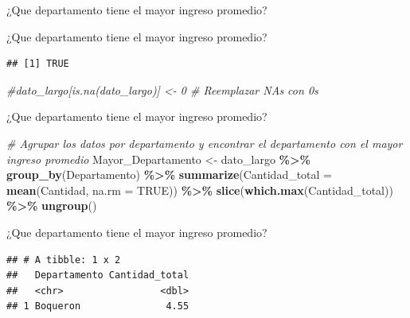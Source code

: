 \documentclass[
  ignorenonframetext,
]{beamer}
\newenvironment{Shaded}{\begin{snugshade}}{\end{snugshade}}
\newcommand{\AttributeTok}[1]{\textcolor[rgb]{0.13,0.29,0.53}{#1}}
\newcommand{\CommentTok}[1]{\textcolor[rgb]{0.56,0.35,0.01}{\textit{#1}}}
\newcommand{\ConstantTok}[1]{\textcolor[rgb]{0.56,0.35,0.01}{#1}}
\newcommand{\FunctionTok}[1]{\textcolor[rgb]{0.13,0.29,0.53}{\textbf{#1}}}
\newcommand{\NormalTok}[1]{#1}
\newcommand{\OtherTok}[1]{\textcolor[rgb]{0.56,0.35,0.01}{#1}}
\newcommand{\SpecialCharTok}[1]{\textcolor[rgb]{0.81,0.36,0.00}{\textbf{#1}}}
\newcommand{\StringTok}[1]{\textcolor[rgb]{0.31,0.60,0.02}{#1}}
\begin{document}
\begin{frame}[fragile]{¿Que departamento tiene el mayor ingreso
promedio?}
\begin{block}{¿Que departamento tiene el mayor ingreso promedio?}
\begin{Shaded}
\end{Shaded}

\begin{verbatim}
## [1] TRUE
\end{verbatim}

\begin{Shaded}
\begin{Highlighting}[]
\CommentTok{\#dato\_largo[is.na(dato\_largo)] \textless{}{-} 0  \# Reemplazar NAs con 0s}
\end{Highlighting}
\end{Shaded}
\end{block}

\begin{block}{¿Que departamento tiene el mayor ingreso promedio?}
\protect\hypertarget{que-departamento-tiene-el-mayor-ingreso-promedio-3}{}
\begin{Shaded}
\begin{Highlighting}[]
\CommentTok{\# Agrupar los datos por departamento y encontrar el departamento con el mayor ingreso promedio}
\NormalTok{Mayor\_Departamento }\OtherTok{\textless{}{-}}\NormalTok{ dato\_largo }\SpecialCharTok{\%\textgreater{}\%}
  \FunctionTok{group\_by}\NormalTok{(Departamento) }\SpecialCharTok{\%\textgreater{}\%}
  \FunctionTok{summarize}\NormalTok{(}\AttributeTok{Cantidad\_total =} \FunctionTok{mean}\NormalTok{(Cantidad, }\AttributeTok{na.rm =} \ConstantTok{TRUE}\NormalTok{)) }\SpecialCharTok{\%\textgreater{}\%}
  \FunctionTok{slice}\NormalTok{(}\FunctionTok{which.max}\NormalTok{(Cantidad\_total)) }\SpecialCharTok{\%\textgreater{}\%}
  \FunctionTok{ungroup}\NormalTok{()}
\end{Highlighting}
\end{Shaded}
\end{block}

\begin{block}{¿Que departamento tiene el mayor ingreso promedio?}
\protect\hypertarget{que-departamento-tiene-el-mayor-ingreso-promedio-4}{}
\begin{verbatim}
## # A tibble: 1 x 2
##   Departamento Cantidad_total
##   <chr>                 <dbl>
## 1 Boqueron               4.55
\end{verbatim}
\end{block}


\end{frame}
\end{document}
